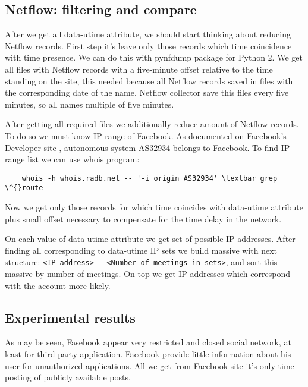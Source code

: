  \subsection{Netflow: filtering and compare}
 After we get all data-utime attribute, we should start thinking about reducing Netflow records. First step it's leave only those records which time coincidence with time presence. We can do this with pynfdump package for Python 2. We get all files with Netflow records with a five-minute offset relative to the time standing on the site, this needed because all Netflow records saved in files with the corresponding date of the name. Netflow collector save this files every five minutes, so all names multiple of five minutes. \par After getting all required files we additionally reduce amount of Netflow records. To do so we must know IP range of Facebook. As documented on Facebook's Developer site \cite{fbDevelop}, autonomous system AS32934 belongs to Facebook. To find IP range list we can use whois program:
 \begin{lstlisting}
    whois -h whois.radb.net -- '-i origin AS32934' \textbar grep \^{}route
\end{lstlisting}
Now we get only those records for which time coincides with data-utime attribute plus small offset necessary to compensate for the time delay in the network. \par On each value of data-utime attribute we get set of possible IP addresses. After finding all corresponding to data-utime IP sets we build massive with next structure: 
\texttt{<IP address> - <Number of meetings in sets>}, and sort this massive by number of meetings. On top we get IP addresses which correspond with the account more likely.
\subsection{Experimental results}
As may be seen, Fasebook appear very restricted and closed social network, at least for third-party application. Facebook provide little information about his user for unauthorized applications. All we get from Facebook site it's only time posting of publicly available posts.
